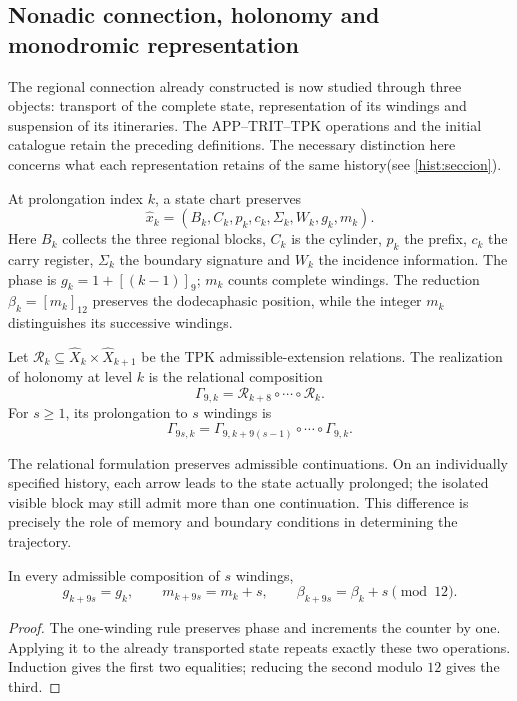 \subsection{Nonadic connection, holonomy and monodromic representation}
\label{mono-ampl:conexion}

The regional connection already constructed is now studied through three objects:
transport of the complete state, representation of its windings and
suspension of its itineraries. The APP--TRIT--TPK operations and the
initial catalogue retain the preceding definitions. The necessary distinction
here concerns what each representation retains of the
same history(see \ref{hist:seccion}).

At prolongation index \(k\), a state chart preserves
\[
 \widehat x_k=(B_k,C_k,p_k,c_k,\Sigma_k,W_k,g_k,m_k).
\]
Here \(B_k\) collects the three regional blocks, \(C_k\) is the cylinder,
\(p_k\) the prefix, \(c_k\) the carry register, \(\Sigma_k\) the boundary
signature and \(W_k\) the incidence information. The phase is
\(g_k=1+[(k-1)]_9\); \(m_k\) counts complete windings. The reduction
\(\beta_k=[m_k]_{12}\) preserves the dodecaphasic position, while the
integer \(m_k\) distinguishes its successive windings.

\begin{definition}
\label{mono-ampl:def-vuelta}
Let \(\mathcal R_k\subseteq\widehat X_k\times\widehat X_{k+1}\)
be the TPK admissible-extension relations. The realization of
holonomy at level \(k\) is the relational composition
\[
 \Gamma_{9,k}=\mathcal R_{k+8}\circ\cdots\circ\mathcal R_k.
\]
For \(s\geq1\), its prolongation to \(s\) windings is
\[
 \Gamma_{9s,k}=
 \Gamma_{9,k+9(s-1)}\circ\cdots\circ\Gamma_{9,k}.
\]
\end{definition}

The relational formulation preserves admissible continuations. On
an individually specified history, each arrow leads to the state actually
prolonged; the isolated visible block may still admit more than one
continuation. This difference is precisely the role of memory and
boundary conditions in determining the trajectory.

\begin{proposition}
\label{mono-ampl:vueltas}
In every admissible composition of \(s\) windings,
\[
 g_{k+9s}=g_k,\qquad m_{k+9s}=m_k+s,\qquad
 \beta_{k+9s}=\beta_k+s\pmod{12}.
\]
\end{proposition}
\begin{proof}
The one-winding rule preserves phase and increments the counter by
one. Applying it to the already transported state repeats exactly these
two operations. Induction gives the first two equalities; reducing the
second modulo \(12\) gives the third.
\end{proof}

